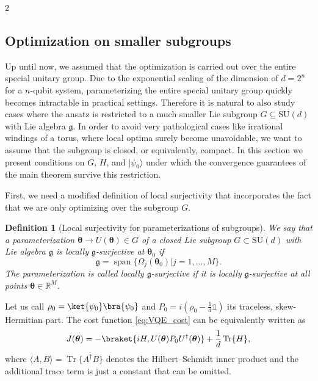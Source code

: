 \documentclass{article}
\renewcommand{\vec}[1]{\ensuremath{\boldsymbol{#1}}}
\newtheorem{definition}{Definition}
\begin{document}
\begin{multicols}{2}
\subsection{Optimization on smaller subgroups}
Up until now, we assumed that the optimization is carried out over the entire special unitary group.
Due to the exponential scaling of the dimension of \(d = 2^n\) for a \(n\)-qubit system, parameterizing the entire special unitary group quickly becomes intractable in practical settings.
Therefore it is natural to also study cases where the ansatz is restricted to a much smaller Lie subgroup $G \subseteq \mathrm{SU}(d)$ with Lie algebra $\mathfrak g$. 
In order to avoid very pathological cases like irrational windings of a torus, where local optima surely become unavoidable, we want to assume that the subgroup is closed, or equivalently, compact.
In this section we present conditions on $G$, $H$, and $\lvert\psi_0\rangle$ under which the convergence guarantees of the main theorem survive this restriction.

First, we need a modified definition of local surjectivity that incorporates the fact that we are only optimizing over the subgroup \(G\).
\begin{definition}[Local surjectivity for parameterizations of subgroups]
    We say that a parameterization \(\vec{\theta} \rightarrow U(\vec{\theta}) \in G\) of a closed Lie subgroup \(G \subset \mathrm{SU}(d)\) with Lie algebra \(\mathfrak{g}\) is locally \(\mathfrak{g}\)-surjective at \(\vec{\theta}_0\) if
    \begin{equation}
        \mathfrak{g} = \operatorname{span}\{\Omega_j(\vec{\theta}_0) \lvert j = 1,...,M\}.
    \end{equation}
    The parameterization is called locally \(\mathfrak{g}\)-surjective if it is locally \(\mathfrak{g}\)-surjective at all points \(\vec{\theta} \in \mathds{R}^M\).
\end{definition}

Let us call \(\rho_0 = \ket{\psi_0}\bra{\psi_0}\) and \(P_0 = i(\rho_0 - \frac{1}{d}\mathds{1})\) its traceless, skew-Hermitian part.
The cost function \eqref{eq:VQE_cost} can be equivalently written as
\begin{equation}
    \label{eq:cost_moment_map}
    J(\vec{\theta}) = -\braket{iH, U(\vec{\theta}) P_0 U^\dagger(\vec{\theta})} + \frac{1}{d}\operatorname{Tr}\{H\},
\end{equation}
where \(\langle A, B\rangle = \operatorname{Tr}\{A^\dagger B\}\) denotes the Hilbert--Schmidt inner product and the additional trace term is just a constant that can be omitted.


\end{multicols}
\end{document}
